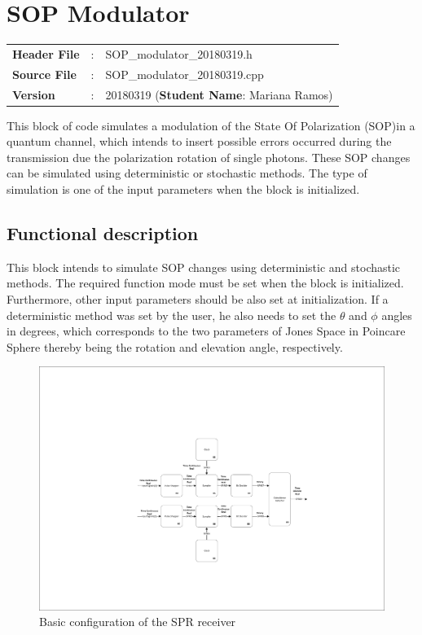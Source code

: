 \clearpage

\section{SOP Modulator}

\begin{tcolorbox}	
\begin{tabular}{p{2.75cm} p{0.2cm} p{10.5cm}} 	
\textbf{Header File}   &:& SOP\_modulator\_20180319.h \\
\textbf{Source File}   &:& SOP\_modulator\_20180319.cpp \\
\textbf{Version}       &:& 20180319 (\textbf{Student Name}: Mariana Ramos)
\end{tabular}
\end{tcolorbox}


This block of code simulates a modulation of the State Of Polarization (SOP)in a quantum channel, which intends to insert possible errors occurred during the transmission due the polarization rotation of single photons. These SOP changes can be simulated using deterministic or stochastic methods. The type of simulation is one of the input parameters when the block is initialized.


\subsection*{Functional description}

This block intends to simulate SOP changes using deterministic and stochastic methods. The required function mode must be set when the block is initialized. Furthermore, other input parameters should be also set at initialization. If a deterministic method was set by the user, he also needs to set the $\theta$ and $\phi$ angles in degrees, which corresponds to the two parameters of Jones Space in Poincare Sphere thereby being the rotation and elevation angle, respectively.

\begin{figure}[h]
	\centering
	\includegraphics[clip, trim=8cm 4cm 6cm 5cm, width=1.00\textwidth]{../lib/single_photon_receiver/figures/single_photon_receiver.pdf}
	\caption{Basic configuration of the SPR receiver}\label{SPR_receiver_block_diagram_simple}
\end{figure}

